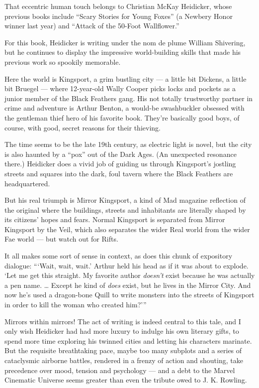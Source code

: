 That eccentric human touch belongs to Christian McKay Heidicker, whose
previous books include ``Scary Stories for Young Foxes'' (a Newbery
Honor winner last year) and ``Attack of the 50-Foot Wallflower.''

For this book, Heidicker is writing under the nom de plume William
Shivering, but he continues to display the impressive world-building
skills that made his previous work so spookily memorable.

Here the world is Kingsport, a grim bustling city --- a little bit
Dickens, a little bit Bruegel --- where 12-year-old Wally Cooper picks
locks and pockets as a junior member of the Black Feathers gang. His not
totally trustworthy partner in crime and adventure is Arthur Benton, a
would-be swashbuckler obsessed with the gentleman thief hero of his
favorite book. They're basically good boys, of course, with good, secret
reasons for their thieving.

The time seems to be the late 19th century, as electric light is novel,
but the city is also haunted by a ``pox'' out of the Dark Ages. (An
unexpected resonance there.) Heidicker does a vivid job of guiding us
through Kingsport's jostling streets and squares into the dark, foul
tavern where the Black Feathers are headquartered.

But his real triumph is Mirror Kingsport, a kind of Mad magazine
reflection of the original where the buildings, streets and inhabitants
are literally shaped by its citizens' hopes and fears. Normal Kingsport
is separated from Mirror Kingsport by the Veil, which also separates the
wider Real world from the wider Fae world --- but watch out for Rifts.

It all makes some sort of sense in context, as does this chunk of
expository dialogue: ```Wait, wait, wait.' Arthur held his head as if it
was about to explode. `Let me get this straight. My favorite author
\emph{doesn't} exist because he was actually a pen name. \ldots{} Except
he kind of \emph{does} exist, but he lives in the Mirror City. And now
he's used a dragon-bone Quill to write monsters into the streets of
Kingsport in order to kill the woman who created him?'''

Mirrors within mirrors! The act of writing is indeed central to this
tale, and I only wish Heidicker had had more luxury to indulge his own
literary gifts, to spend more time exploring his twinned cities and
letting his characters marinate. But the requisite breathtaking pace,
maybe too many subplots and a series of cataclysmic airborne battles,
rendered in a frenzy of action and shouting, take precedence over mood,
tension and psychology --- and a debt to the Marvel Cinematic Universe
seems greater than even the tribute owed to J. K. Rowling.

